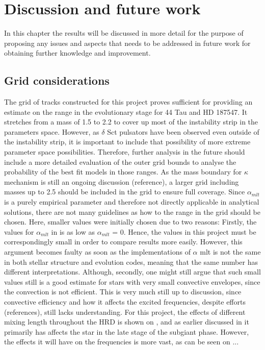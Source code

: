 \chapter{Discussion and future work}
\label{sec:discussion}

In this chapter the results will be discussed in more detail for the purpose of proposing any issues and aspects that needs to be addressed in future work for obtaining further knowledge and improvement. 

\section{Grid considerations}

The grid of tracks constructed for this project proves sufficient for providing an estimate on the range in the evolutionary stage for 44 Tau and HD 187547. It stretches from a mass of 1.5 to 2.2 \msun to cover up most of the instability strip in the parameters space. However, as $\delta$ Sct pulsators have been observed even outside of the instability strip, it is important to include that possibility of more extreme parameter space possibilities. Therefore, further analysis in the future should include a more detailed evaluation of the outer grid bounds to analyse the probability of the best fit models in those ranges. As the mass boundary for $\kappa$ mechanism is still an ongoing discussion (reference), a larger grid including masses up to 2.5 \msun should be included in the grid to ensure full coverage. 
Since $\alpha_{mlt}$ is a purely empirical parameter and therefore not directly applicable in analytical solutions, there are not many guidelines as how to the range in the grid should be chosen. Here, smaller values were initially chosen due to two reasons: Firstly, the values for $\alpha_{mlt}$ in \citep{lenz2010delta} is as low as $\alpha_{mlt}$ = 0. Hence, the values in this project must be correspondingly small in order to compare results more easily. However, this argument becomes faulty as soon as the implementations of $\alpha$ mlt is not the same in both stellar structure and evolution codes, meaning that the same number has different interpretations. Although, secondly, one might still argue that such small values still is a good estimate for stars with very small convective envelopes, since the convection is not efficient. This is very much still up to discussion, since convective efficiency and how it affects the excited frequencies, despite efforts (references), still lacks understanding. For this project, the effects of different mixing length throughout the HRD is shown on , and as earlier discussed in  it primarily has affects the star in the late stage of the subgiant phase.  However, the effects it will have on the frequencies is more vast, as can be seen on ...

